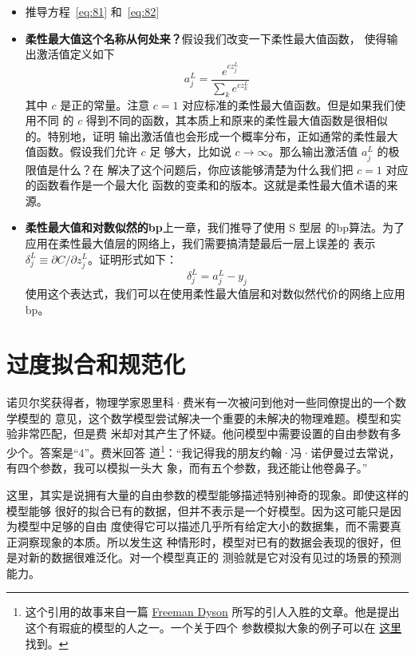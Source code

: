 \begin{itemize}
\item 推导方程~\eqref{eq:81} 和~\eqref{eq:82}
\item \textbf{柔性最大值这个名称从何处来？}\quad 假设我们改变一下柔性最大值函数，
  使得输出激活值定义如下
  \begin{equation}
    a^L_j = \frac{e^{c z^L_j}}{\sum_k e^{c z^L_k}}
    \label{eq:83}\tag{83}
  \end{equation}
  其中 $c$ 是正的常量。注意 $c=1$ 对应标准的柔性最大值函数。但是如果我们使用不同
  的 $c$ 得到不同的函数，其本质上和原来的柔性最大值函数是很相似的。特别地，证明
  输出激活值也会形成一个概率分布，正如通常的柔性最大值函数。假设我们允许 $c$ 足
  够大，比如说 $c\rightarrow \infty$。那么输出激活值 $a_j^L$ 的极限值是什么？在
  解决了这个问题后，你应该能够清楚为什么我们把 $c=1$ 对应的函数看作是一个最大化
  函数的变柔和的版本。这就是柔性最大值术语的来源。
\item \textbf{柔性最大值和对数似然的\gls*{bp}}\quad 上一章，我们推导了使用 S 型层
  的\gls*{bp}算法。为了应用在柔性最大值层的网络上，我们需要搞清楚最后一层上误差的
  表示 $\delta^L_j \equiv \partial C / \partial z^L_j$。证明形式如下：
  \begin{equation}
    \delta^L_j = a^L_j -y_j
    \label{eq:84}\tag{84}
  \end{equation}
  使用这个表达式，我们可以在使用柔性最大值层和对数似然代价的网络上应用\gls*{bp}。
\end{itemize}

\section{过度拟合和规范化}
\label{sec:overfitting_and_regularization}

诺贝尔奖获得者，物理学家恩里科·费米有一次被问到他对一些同僚提出的一个数学模型的
意见，这个数学模型尝试解决一个重要的未解决的物理难题。模型和实验非常匹配，但是费
米却对其产生了怀疑。他问模型中需要设置的自由参数有多少个。答案是“4”。费米回答
道\footnote{这个引用的故事来自一篇
  \href{http://www.nature.com/nature/journal/v427/n6972/full/427297a.html}{Freeman
    Dyson} 所写的引人入胜的文章。他是提出这个有瑕疵的模型的人之一。一个关于四个
  参数模拟大象的例子可以在%
  \href{http://www.johndcook.com/blog/2011/06/21/how-to-fit-an-elephant/}{这里}%
  找到。}：“我记得我的朋友约翰·冯·诺伊曼过去常说，有四个参数，我可以模拟一头大
象，而有五个参数，我还能让他卷鼻子。”

这里，其实是说拥有大量的自由参数的模型能够描述特别神奇的现象。即使这样的模型能够
很好的拟合已有的数据，但并不表示是一个好模型。因为这可能只是因为模型中足够的自由
度使得它可以描述几乎所有给定大小的数据集，而不需要真正洞察现象的本质。所以发生这
种情形时，模型对已有的数据会表现的很好，但是对新的数据很难泛化。对一个模型真正的
测验就是它对没有见过的场景的预测能力。

